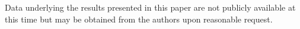 \documentclass{optica-article}
\begin{document}
\begin{backmatter}


\noindent Data underlying the results presented in this paper are not publicly available at this time but may be obtained from the authors upon reasonable request.











\end{backmatter}
\end{document}
